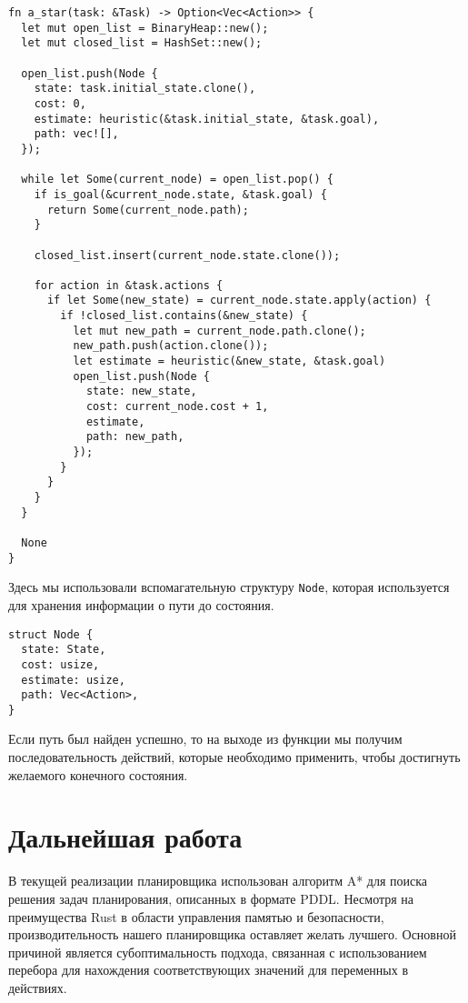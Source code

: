 \documentclass{article}
\begin{document}
\begin{verbatim}
fn a_star(task: &Task) -> Option<Vec<Action>> {
  let mut open_list = BinaryHeap::new();
  let mut closed_list = HashSet::new();

  open_list.push(Node {
    state: task.initial_state.clone(),
    cost: 0,
    estimate: heuristic(&task.initial_state, &task.goal),
    path: vec![],
  });

  while let Some(current_node) = open_list.pop() {
    if is_goal(&current_node.state, &task.goal) {
      return Some(current_node.path);
    }

    closed_list.insert(current_node.state.clone());

    for action in &task.actions {
      if let Some(new_state) = current_node.state.apply(action) {
        if !closed_list.contains(&new_state) {
          let mut new_path = current_node.path.clone();
          new_path.push(action.clone());
          let estimate = heuristic(&new_state, &task.goal)
          open_list.push(Node {
            state: new_state,
            cost: current_node.cost + 1,
            estimate,
            path: new_path,
          });
        }
      }
    }
  }

  None
}
\end{verbatim}

Здесь мы использовали вспомагательную структуру \texttt{Node},
которая используется для хранения информации о пути до состояния.

\begin{verbatim}
struct Node {
  state: State,
  cost: usize,
  estimate: usize,
  path: Vec<Action>,
}
\end{verbatim}

Если путь был найден успешно, то на выходе из функции мы получим последовательность действий,
которые необходимо применить, чтобы достигнуть желаемого конечного состояния.

\newpage

\section{Дальнейшая работа}

В текущей реализации планировщика использован алгоритм A* для поиска решения задач планирования, описанных в формате PDDL. Несмотря на преимущества Rust в области управления памятью и безопасности, производительность нашего планировщика оставляет желать лучшего. Основной причиной является субоптимальность подхода, связанная с использованием перебора для нахождения соответствующих значений для переменных в действиях.
\end{document}
